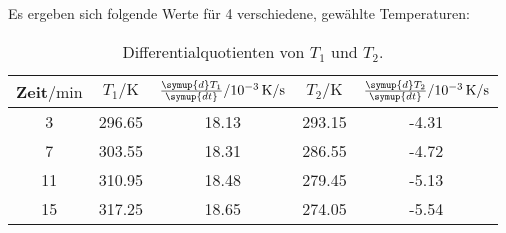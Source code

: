 Es ergeben sich folgende Werte für 4 verschiedene, gewählte Temperaturen:
\begin{table}[H]
    \centering
    \caption{Differentialquotienten von $T_1$ und $T_2$.}
    \label{tab:t2}
    \begin{tabular}{S[table-format=2.0] S[table-format=3.2] S[table-format=2.2(3)] S[table-format=3.2] S[table-format=+1.2(3)]}
        \toprule
        {Zeit$/\si{\minute}$} & {$T_1/\si{\kelvin}$} & {$\frac{\symup{d}T_1}{\symup{dt}}/\SI{e-3}{\kelvin\per\second}$} & {$T_2/\si{\kelvin}$} & {$\frac{\symup{d}T_2}{\symup{dt}}/\SI{e-3}{\kelvin\per\second}$} \\
           & 296.65    & 18.13  &  293.15 & -4.31 \\
        7   & 303.55    & 18.31  &  286.55 & -4.72 \\
        11  & 310.95    & 18.48  &  279.45 & -5.13 \\
        15  & 317.25    & 18.65  &  274.05 & -5.54 \\
        \bottomrule
    \end{tabular}
\end{table}
%
